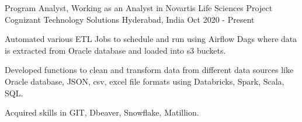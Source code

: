

\begin{cventries}

  \cventry
    {Program Analyst, Working as an Analyst in Novartis Life Sciences Project}%
    {Cognizant Technology Solutions} %
    {Hyderabad, India} %
    {Oct 2020 - Present} %
    {
      \begin{cvitems} %
        \item {Automated various ETL Jobs to schedule and run using Airflow Dags where data is extracted from Oracle database and loaded into s3 buckets.}
        \item {Developed functions to clean and transform data from different data sources like Oracle database, JSON, csv, excel file formats using Databricks, Spark, Scala, SQL.}
        \item {Acquired skills in GIT, Dbeaver, Snowflake, Matillion.}
      \end{cvitems}
    }


\end{cventries}
